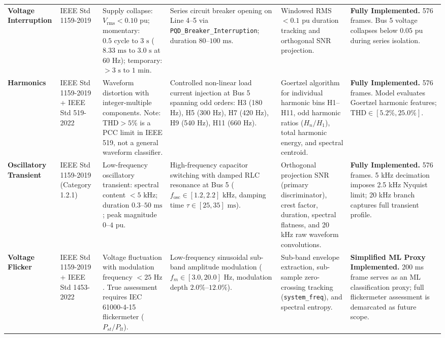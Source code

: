 \documentclass[12pt,a4paper]{report}
\begin{document}
\begin{table}[H]
\begin{tabularx}{\textwidth}{p{1.7cm}p{1.6cm}p{2.5cm}p{2.7cm}p{2.7cm}p{2.4cm}}
\addlinespace
\textbf{Voltage Interruption} & IEEE Std 1159-2019 & Supply collapse: $V_{\text{rms}} < 0.10\text{ pu}$; momentary: $0.5\text{ cycle to }3\text{ s}$ ($8.33\text{ ms to }3.0\text{ s}$ at 60 Hz); temporary: $>3\text{ s to }1\text{ min}$. & Series circuit breaker opening on Line 4--5 via \texttt{PQD\_Breaker\_Interruption}; duration $80\text{--}100\text{ ms}$. & Windowed RMS $<0.1\text{ pu}$ duration tracking and orthogonal SNR projection. & \textbf{Fully Implemented.} 576 frames. Bus 5 voltage collapses below $0.05\text{ pu}$ during series isolation. \\
\addlinespace
\textbf{Harmonics} & IEEE Std 1159-2019 + IEEE Std 519-2022 & Waveform distortion with integer-multiple components. Note: $\text{THD} > 5\%$ is a PCC limit in IEEE 519, not a general waveform classifier. & Controlled non-linear load current injection at Bus 5 spanning odd orders: H3 (180 Hz), H5 (300 Hz), H7 (420 Hz), H9 (540 Hz), H11 (660 Hz). & Goertzel algorithm for individual harmonic bins H1--H11, odd harmonic ratios ($H_n/H_1$), total harmonic energy, and spectral centroid. & \textbf{Fully Implemented.} 576 frames. Model evaluates Goertzel harmonic features; $\text{THD} \in [5.2\%, 25.0\%]$. \\
\addlinespace
\textbf{Oscillatory Transient} & IEEE Std 1159-2019 (Category 1.2.1) & Low-frequency oscillatory transient: spectral content $<5\text{ kHz}$; duration $0.3\text{--}50\text{ ms}$; peak magnitude $0\text{--}4\text{ pu}$. & High-frequency capacitor switching with damped RLC resonance at Bus 5 ($f_{\text{osc}} \in [1.2, 2.2]\text{ kHz}$, damping time $\tau \in [25, 35]\text{ ms}$). & Orthogonal projection SNR (primary discriminator), crest factor, duration, spectral flatness, and 20 kHz raw waveform convolutions. & \textbf{Fully Implemented.} 576 frames. 5 kHz decimation imposes 2.5 kHz Nyquist limit; 20 kHz branch captures full transient profile. \\
\addlinespace
\textbf{Voltage Flicker} & IEEE Std 1159-2019 + IEEE Std 1453-2022 & Voltage fluctuation with modulation frequency $<25\text{ Hz}$. True assessment requires IEC 61000-4-15 flickermeter ($P_{st}/P_{lt}$). & Low-frequency sinusoidal sub-band amplitude modulation ($f_m \in [3.0, 20.0]\text{ Hz}$, modulation depth $2.0\%\text{--}12.0\%$). & Sub-band envelope extraction, sub-sample zero-crossing tracking (\texttt{system\_freq}), and spectral entropy. & \textbf{Simplified ML Proxy Implemented.} 200 ms frame serves as an ML classification proxy; full flickermeter assessment is demarcated as future scope. \\

\end{tabularx}
\end{table}
\end{document}

